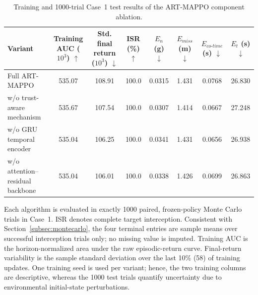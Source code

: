 \begin{table}[!b]
\centering
\scriptsize
\color{blue}
\caption{Training and 1000-trial Case~1 test results of the ART-MAPPO component ablation.}
\label{tab:compact_ablation_v3}
\renewcommand{\arraystretch}{1.12}
\setlength{\tabcolsep}{3.0pt}
\begin{tabular}{lccccccc}
\toprule
Variant & Training AUC ($10^3$) $\uparrow$ & Std. final return ($10^3$) $\downarrow$ & ISR (\%) $\uparrow$ & $E_n$ (g) $\downarrow$ & $E_{miss}$ (m) $\downarrow$ & $E_{co\text{-}time}$ (s) $\downarrow$ & $E_t$ (s) $\downarrow$ \\
\midrule
Full ART-MAPPO & 535.07 & 108.91 & 100.0 & 0.0315 & 1.431 & 0.0768 & 26.830 \\
w/o trust-aware mechanism & 535.67 & 107.54 & 100.0 & 0.0307 & 1.414 & 0.0667 & 27.248 \\
w/o GRU temporal encoder & 535.04 & 106.25 & 100.0 & 0.0341 & 1.431 & 0.0656 & 26.938 \\
w/o attention--residual backbone & 535.04 & 106.01 & 100.0 & 0.0338 & 1.426 & 0.0699 & 26.863 \\
\bottomrule
\end{tabular}
\vspace{1mm}\parbox{0.99\linewidth}{\footnotesize Each algorithm is evaluated in exactly 1000 paired, frozen-policy Monte Carlo trials in Case~1. ISR denotes complete target interception. Consistent with Section~\ref{subsec:montecarlo}, the four terminal entries are sample means over successful interception trials only; no missing value is imputed. Training AUC is the horizon-normalized area under the raw episodic-return curve. Final-return variability is the sample standard deviation over the last 10\% (58) of training updates. One training seed is used per variant; hence, the two training columns are descriptive, whereas the 1000 test trials quantify uncertainty due to environmental initial-state perturbations.}
\end{table}
